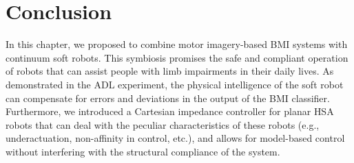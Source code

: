 \section{Conclusion}
In this chapter, we proposed to combine motor imagery-based \gls{BMI} systems with continuum soft robots. This symbiosis promises the safe and compliant operation of robots that can assist people with limb impairments in their daily lives.
As demonstrated in the \gls{ADL} experiment, the physical intelligence of the soft robot can compensate for errors and deviations in the output of the \gls{BMI} classifier.
Furthermore, we introduced a Cartesian impedance controller for planar \gls{HSA} robots that can deal with the peculiar characteristics of these robots (e.g., underactuation, non-affinity in control, etc.), and allows for model-based control without interfering with the structural compliance of the system.
